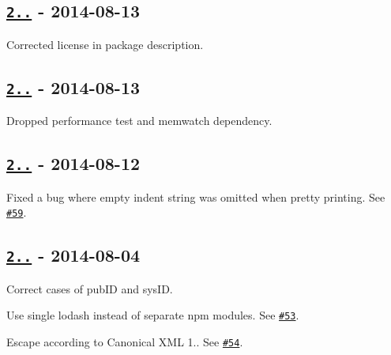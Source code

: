 \subsection*{\href{https://github.com/oozcitak/xmlbuilder-js/compare/v2.4.2...v2.4.3}{\tt 2..} -\/ 2014-\/08-\/13}


\begin{DoxyItemize}
\item Corrected license in package description.
\end{DoxyItemize}

\subsection*{\href{https://github.com/oozcitak/xmlbuilder-js/compare/v2.4.1...v2.4.2}{\tt 2..} -\/ 2014-\/08-\/13}


\begin{DoxyItemize}
\item Dropped performance test and memwatch dependency.
\end{DoxyItemize}

\subsection*{\href{https://github.com/oozcitak/xmlbuilder-js/compare/v2.4.0...v2.4.1}{\tt 2..} -\/ 2014-\/08-\/12}


\begin{DoxyItemize}
\item Fixed a bug where empty indent string was omitted when pretty printing. See \href{https://github.com/oozcitak/xmlbuilder-js/issues/59}{\tt \#59}.
\end{DoxyItemize}

\subsection*{\href{https://github.com/oozcitak/xmlbuilder-js/compare/v2.3.0...v2.4.0}{\tt 2..} -\/ 2014-\/08-\/04}


\begin{DoxyItemize}
\item Correct cases of pub\+ID and sys\+ID.
\item Use single lodash instead of separate npm modules. See \href{https://github.com/oozcitak/xmlbuilder-js/issues/53}{\tt \#53}.
\item Escape according to Canonical X\+ML 1.. See \href{https://github.com/oozcitak/xmlbuilder-js/issues/54}{\tt \#54}.
\end{DoxyItemize}

